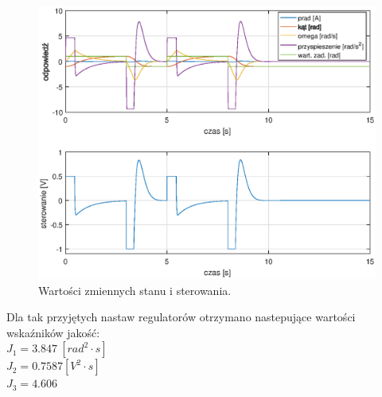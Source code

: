 \begin{figure}[h!]
	\centering
	\includegraphics[scale = 1]{fig/pid_response.eps}
	\caption		
	{Wartości zmiennych stanu i sterowania.}
	\label{pid_res}
\end{figure} 
Dla tak przyjętych nastaw regulatorów otrzymano nastepujące wartości wska\'zników jakość:\\
$J_1 = 3.847 \ [rad^2 \cdot s]$\\
$J_2 = 0.7587 [V^2 \cdot s]$\\
$J_3 = 4.606$\\

